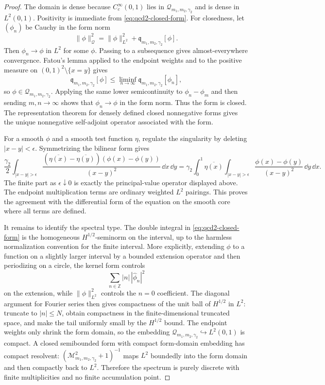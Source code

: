 \begin{proof}
The domain is dense because \(C_c^\infty(0,1)\) lies in
\(\mathcal Q_{m_1,m_2,\gamma_2}\) and is dense in \(L^2(0,1)\).  Positivity is
immediate from \eqref{eq:qcd2-closed-form}.  For closedness, let
\((\phi_n)\) be Cauchy in the form norm
\[
  \|\phi\|_{\mathcal Q}^2
  =
  \|\phi\|_{L^2}^2+\mathfrak q_{m_1,m_2,\gamma_2}[\phi].
\]
Then \(\phi_n\to\phi\) in \(L^2\) for some \(\phi\).  Passing to a subsequence
gives almost-everywhere convergence.  Fatou's lemma applied to the endpoint
weights and to the positive measure on
\((0,1)^2\setminus\{x=y\}\) gives
\[
  \mathfrak q_{m_1,m_2,\gamma_2}[\phi]
  \leq
  \liminf_{n\to\infty}
  \mathfrak q_{m_1,m_2,\gamma_2}[\phi_n],
\]
so \(\phi\in\mathcal Q_{m_1,m_2,\gamma_2}\).  Applying the same lower
semicontinuity to \(\phi_n-\phi_m\) and then sending \(m,n\to\infty\) shows
that \(\phi_n\to\phi\) in the form norm.  Thus the form is closed.  The
representation theorem for densely defined closed nonnegative forms gives the
unique nonnegative self-adjoint operator associated with the form.

For a smooth \(\phi\) and a smooth test function \(\eta\), regulate the
singularity by deleting \(|x-y|<\epsilon\).  Symmetrizing the bilinear form
gives
\[
  \frac{\gamma_2}{2}\int_{|x-y|>\epsilon}
  \frac{(\overline{\eta(x)}-\overline{\eta(y)})
        (\phi(x)-\phi(y))}{(x-y)^2}\,\dd x\,\dd y
  =
  \gamma_2\int_0^1\overline{\eta(x)}
  \int_{|x-y|>\epsilon}
  \frac{\phi(x)-\phi(y)}{(x-y)^2}\,\dd y\,\dd x .
\]
The finite part as \(\epsilon\downarrow0\) is exactly the principal-value
operator displayed above.  The endpoint multiplication terms are ordinary
weighted \(L^2\) pairings.  This proves the agreement with the differential
form of the equation on the smooth core where all terms are defined.

It remains to identify the spectral type.  The double integral in
\eqref{eq:qcd2-closed-form} is the homogeneous \(H^{1/2}\)-seminorm on the
interval, up to the harmless normalization convention for the finite
interval.  More explicitly, extending \(\phi\) to a function on a slightly
larger interval by a bounded extension operator and then periodizing on a
circle, the kernel form controls
\[
  \sum_{n\in\mathbb Z}|n|\,|\widehat\phi_n|^2
\]
on the extension, while \(\|\phi\|_{L^2}^2\) controls the \(n=0\) coefficient.
The diagonal argument for Fourier series then gives compactness of the unit
ball of \(H^{1/2}\) in \(L^2\): truncate to \(|n|\leq N\), obtain compactness
in the finite-dimensional truncated space, and make the tail uniformly small
by the \(H^{1/2}\) bound.  The endpoint weights only shrink the form domain,
so the embedding
\(\mathcal Q_{m_1,m_2,\gamma_2}\hookrightarrow L^2(0,1)\) is compact.  A
closed semibounded form with compact form-domain embedding has compact
resolvent: \((\mathcal M^2_{m_1,m_2,\gamma_2}+1)^{-1}\) maps \(L^2\)
boundedly into the form domain and then compactly back to \(L^2\).
Therefore the spectrum is purely discrete with finite multiplicities and no
finite accumulation point.


\end{proof}
